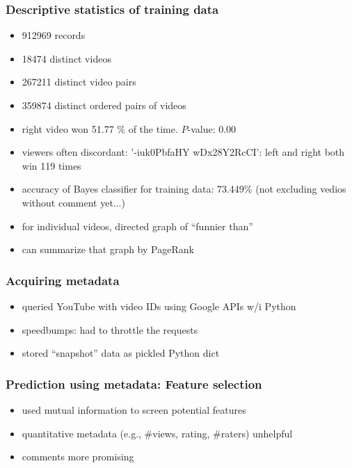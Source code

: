 \documentclass[fleqn]{beamer}
\begin{document}
\begin{frame}
\frametitle{Descriptive statistics of training data}
      \begin{itemize}
         \item 912969 records
         \item 18474 distinct videos
         \item 267211 distinct video pairs
         \item 359874 distinct ordered pairs of videos
         \item right video won 51.77 \% of the time. $P$-value: 0.00
         \item viewers often discordant: '-iuk0PbfaHY wDx28Y2RcCI': left and right both win 119 times
         \item accuracy of Bayes classifier for training data: 73.449\% (not excluding vedios without comment yet...)
         \item for individual videos, directed graph of ``funnier than''
         \item can summarize that graph by PageRank
     \end{itemize}

\end{frame}

\begin{frame}
\frametitle{Acquiring metadata}
   \begin{itemize}
       \item queried YouTube with video IDs using Google APIs w/i Python
       \item speedbumps: had to throttle the requests
       \item stored ``snapshot'' data as pickled Python dict
   \end{itemize}
\end{frame}

\begin{frame}
\frametitle{Prediction using metadata: Feature selection}
      \begin{itemize}
          \item used mutual information to screen potential features
          \item quantitative metadata (e.g., \#views, rating, \#raters) unhelpful
          \item comments more promising
      \end{itemize}

\end{frame}
\end{document}
